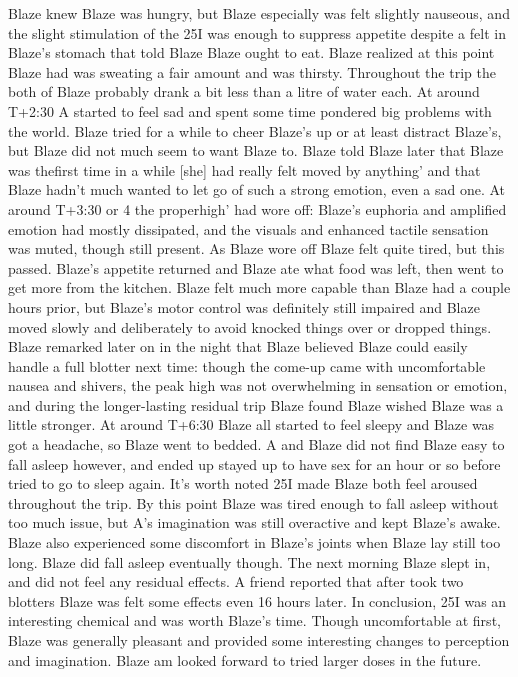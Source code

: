 \documentclass[12pt]{book}
\begin{document}
Blaze knew Blaze was hungry, but Blaze especially was felt slightly nauseous, and the slight stimulation of the 25I was enough to suppress appetite despite a felt in Blaze's stomach that told Blaze Blaze ought to eat. Blaze realized at this point Blaze had was sweating a fair amount and was thirsty. Throughout the trip the both of Blaze probably drank a bit less than a litre of water each. At around T+2:30 A started to feel sad and spent some time pondered big problems with the world. Blaze tried for a while to cheer Blaze's up or at least distract Blaze's, but Blaze did not much seem to want Blaze to. Blaze told Blaze later that Blaze was thefirst time in a while [she] had really felt moved by anything' and that Blaze hadn't much wanted to let go of such a strong emotion, even a sad one. At around T+3:30 or 4 the properhigh' had wore off: Blaze's euphoria and amplified emotion had mostly dissipated, and the visuals and enhanced tactile sensation was muted, though still present. As Blaze wore off Blaze felt quite tired, but this passed. Blaze's appetite returned and Blaze ate what food was left, then went to get more from the kitchen. Blaze felt much more capable than Blaze had a couple hours prior, but Blaze's motor control was definitely still impaired and Blaze moved slowly and deliberately to avoid knocked things over or dropped things. Blaze remarked later on in the night that Blaze believed Blaze could easily handle a full blotter next time: though the come-up came with uncomfortable nausea and shivers, the peak high was not overwhelming in sensation or emotion, and during the longer-lasting residual trip Blaze found Blaze wished Blaze was a little stronger. At around T+6:30 Blaze all started to feel sleepy and Blaze was got a headache, so Blaze went to bedded. A and Blaze did not find Blaze easy to fall asleep however, and ended up stayed up to have sex for an hour or so before tried to go to sleep again. It's worth noted 25I made Blaze both feel aroused throughout the trip. By this point Blaze was tired enough to fall asleep without too much issue, but A's imagination was still overactive and kept Blaze's awake. Blaze also experienced some discomfort in Blaze's joints when Blaze lay still too long. Blaze did fall asleep eventually though. The next morning Blaze slept in, and did not feel any residual effects. A friend reported that after took two blotters Blaze was felt some effects even 16 hours later. In conclusion, 25I was an interesting chemical and was worth Blaze's time. Though uncomfortable at first, Blaze was generally pleasant and provided some interesting changes to perception and imagination. Blaze am looked forward to tried larger doses in the future.
\end{document}
